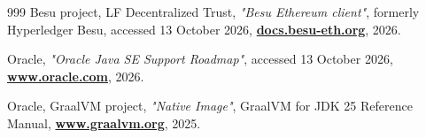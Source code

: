 \documentclass[a4paper,oneside]{article}
\let\oldhref\href
\renewcommand{\href}[2]{\oldhref{#1}{\bfseries#2}}
\begin{document}
\begin{thebibliography}{999}
	Besu project, LF Decentralized Trust,
	\emph{"Besu Ethereum client"},
	formerly Hyperledger Besu, accessed 13 October 2026,
	\href{https://docs.besu-eth.org/}{docs.besu-eth.org},
	2026.

	Oracle,
	\emph{"Oracle Java SE Support Roadmap"},
	accessed 13 October 2026,
	\href{https://www.oracle.com/java/technologies/java-se-support-roadmap.html}{www.oracle.com},
	2026.

	Oracle, GraalVM project,
	\emph{"Native Image"},
	GraalVM for JDK 25 Reference Manual,
	\href{https://www.graalvm.org/jdk25/reference-manual/native-image/}{www.graalvm.org},
	2025.

\end{thebibliography}
\end{document}
